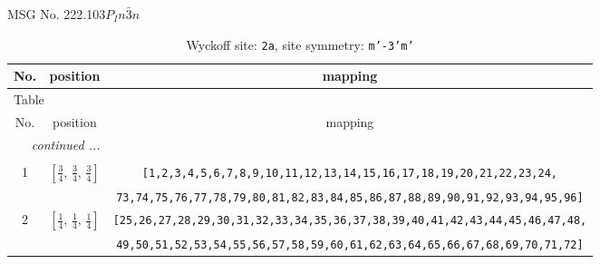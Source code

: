\documentclass[fleqn,8pt]{jsarticle}
\begin{document}
\setcounter{MaxMatrixCols}{32}

\renewcommand{\tablename}{Table~}
\renewcommand{\figurename}{Figure~}
\begin{center}
\LARGE
MSG No. 222.103\quad$P_{I}n\bar{3}n$
\end{center}
\renewcommand{\arraystretch}{1.2}
\begin{longtable}{ccc}
\caption{Wyckoff site: {\tt 2a}, site symmetry: {\tt m'-3'm'}}
 \\
 \hline \hline
No. & position & mapping \\ \hline \endfirsthead

\multicolumn{2}{l}{\tablename\ \thetable{}} \\
 \hline \hline
No. & position & mapping \\ \hline \endhead

 \hline \hline
\multicolumn{2}{r}{\footnotesize\it continued ...} \\ \endfoot

 \hline \hline
\multicolumn{2}{r}{} \\ \endlastfoot

1 & $\left[ \frac{3}{4},\, \frac{3}{4},\, \frac{3}{4} \right]$ & {\tt [1,2,3,4,5,6,7,8,9,10,11,12,13,14,15,16,17,18,19,20,21,22,23,24,} \\ \hline
 &  & {\tt 73,74,75,76,77,78,79,80,81,82,83,84,85,86,87,88,89,90,91,92,93,94,95,96]} \\ \hline
2 & $\left[ \frac{1}{4},\, \frac{1}{4},\, \frac{1}{4} \right]$ & {\tt [25,26,27,28,29,30,31,32,33,34,35,36,37,38,39,40,41,42,43,44,45,46,47,48,} \\ \hline
 &  & {\tt 49,50,51,52,53,54,55,56,57,58,59,60,61,62,63,64,65,66,67,68,69,70,71,72]} \\
\end{longtable}
\renewcommand{\arraystretch}{1.2}
\end{document}
